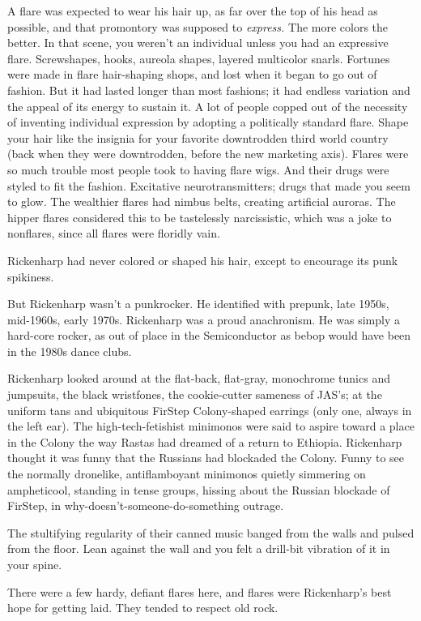 A flare was expected to wear his hair up, as far over the top of his head as possible, and that promontory was supposed to \textit{express.} The more colors the better. In that scene, you weren't an individual unless you had an expressive flare. Screwshapes, hooks, aureola shapes, layered multicolor snarls. Fortunes were made in flare hair-shaping shops, and lost when it began to go out of fashion. But it had lasted longer than most fashions; it had endless variation and the appeal of its energy to sustain it. A lot of people copped out of the necessity of inventing individual expression by adopting a politically standard flare. Shape your hair like the insignia for your favorite downtrodden third world country (back when they were downtrodden, before the new marketing axis). Flares were so much trouble most people took to having flare wigs. And their drugs were styled to fit the fashion. Excitative neurotransmitters; drugs that made you seem to glow. The wealthier flares had nimbus belts, creating artificial auroras. The hipper flares considered this to be tastelessly narcissistic, which was a joke to nonflares, since all flares were floridly vain.

Rickenharp had never colored or shaped his hair, except to encourage its punk spikiness.

But Rickenharp wasn't a punkrocker. He identified with prepunk, late 1950s, mid-1960s, early 1970s. Rickenharp was a proud anachronism. He was simply a hard-core rocker, as out of place in the Semiconductor as bebop would have been in the 1980s dance clubs.

Rickenharp looked around at the flat-back, flat-gray, monochrome tunics and jumpsuits, the black wristfones, the cookie-cutter sameness of JAS's; at the uniform tans and ubiquitous FirStep Colony-shaped earrings (only one, always in the left ear). The high-tech-fetishist minimonos were said to aspire toward a place in the Colony the way Rastas had dreamed of a return to Ethiopia. Rickenharp thought it was funny that the Russians had blockaded the Colony. Funny to see the normally dronelike, antiflamboyant minimonos quietly simmering on ampheticool, standing in tense groups, hissing about the Russian blockade of FirStep, in why-doesn't-someone-do-something outrage.

The stultifying regularity of their canned music banged from the walls and pulsed from the floor. Lean against the wall and you felt a drill-bit vibration of it in your spine.

There were a few hardy, defiant flares here, and flares were Rickenharp's best hope for getting laid. They tended to respect old rock.

